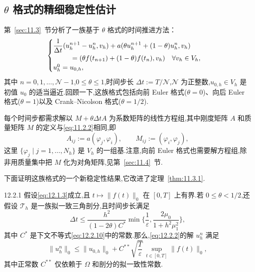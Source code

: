 \subsection{\texorpdfstring{\(\theta\)}{θ} 格式的精细稳定性估计}\label{sec:12.2.1}

第~\ref{sec:11.3}~节分析了一族基于 \(\theta\) 格式的时间推进方法：
\begin{equation}\label{eq:12.2.2}
  \begin{cases}
    \begin{aligned}
      &\dfrac{1}{\Delta t}(u_h^{n+1}-u_h^n,v_h)
         +a(\theta u_h^{n+1}+(1-\theta)u_h^n,v_h)\\
      &\hspace{2.5em}=(\theta f(t_{n+1})+(1-\theta)f(t_n),v_h)
           \quad\forall v_h\in V_h,
    \end{aligned}\\[2pt]
    u_h^0=u_{0,h},
  \end{cases}
\end{equation}
其中 \(n=0,1,\ldots,\mathcal N-1\),\(0\le\theta\le1\),时间步长 \(\Delta t:=T/\mathcal N\),\(\mathcal N\) 为正整数,\(u_{0,h}\in V_h\) 是初值 \(u_0\) 的适当逼近.回顾一下,这族格式包括向前 Euler 格式(\(\theta=0\))、向后 Euler 格式(\(\theta=1\))以及 Crank--Nicolson 格式(\(\theta=1/2\)).

每个时间步都需求解以 \(M+\theta\Delta t A\) 为系数矩阵的线性方程组,其中刚度矩阵 \(A\) 和质量矩阵 \(M\) 的定义与\eqref{eq:11.2.2}相同,即
\begin{equation}\label{eq:12.2.3}
  A_{ij}:=a(\varphi_j,\varphi_i),\qquad M_{ij}:=(\varphi_i,\varphi_j),
\end{equation}
这里 \(\{\varphi_j\mid j=1,\ldots,N_h\}\) 是 \(V_h\) 的一组基.注意,向前 Euler 格式也需要解方程组,除非用质量集中把 \(M\) 化为对角矩阵,见第~\ref{sec:11.4}~节.

下面证明这族格式的一个新稳定性结果,它改进了定理~\ref{thm:11.3.1}.

\begin{proposition}[]{12.2.1}
假设\eqref{eq:12.1.3}成立,且 \(t\mapsto\|f(t)\|_0\) 在 \([0,T]\) 上有界.若 \(0\le\theta<1/2\),还假设 \(\mathcal T_h\) 是一族拟一致三角剖分,且时间步长满足
\begin{equation}\label{eq:12.2.4}
  \Delta t\le\frac{h^2}{(1-2\theta)C^*}
    \min\biggl\{\frac1\varepsilon,\frac{2\mu_0}{1+h^2\mu_1^2}\biggr\},
\end{equation}
其中 \(C^*\) 是下文不等式\eqref{eq:12.2.10}中的常数.那么,\eqref{eq:12.2.2}的解 \(u_h^n\) 满足
\begin{equation}\label{eq:12.2.5}
  \|u_h^n\|_0
    \le\|u_{0,h}\|_0+C^{**}\sqrt{\frac{T}{\varepsilon}}\,
    \sup_{t\in[0,T]}\|f(t)\|_0,
\end{equation}
其中正常数 \(C^{**}\) 仅依赖于 \(\Omega\) 和剖分的拟一致性常数.
\end{proposition}

